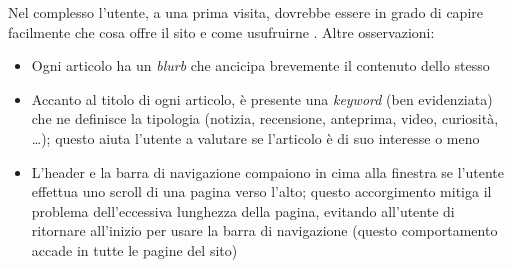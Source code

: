 Nel complesso l'utente, a una prima visita, dovrebbe essere in grado di capire facilmente che cosa offre il sito e come usufruirne \cmark.
Altre osservazioni:
\begin{itemize}
    \item[\cmark] Ogni articolo ha un \emph{blurb} che ancicipa brevemente il contenuto dello stesso
    \item[\cmark] Accanto al titolo di ogni articolo, è presente una \emph{keyword} (ben evidenziata) che ne definisce la tipologia (notizia, recensione, anteprima, video, curiosità, \ldots); questo aiuta l'utente a valutare se l'articolo è di suo interesse o meno
    \item[\cmark] L'header e la barra di navigazione compaiono in cima alla finestra se l'utente effettua uno scroll di una pagina verso l'alto; questo accorgimento mitiga il problema dell'eccessiva lunghezza della pagina, evitando all'utente di ritornare all'inizio per usare la barra di navigazione (questo comportamento accade in tutte le pagine del sito)
\end{itemize}